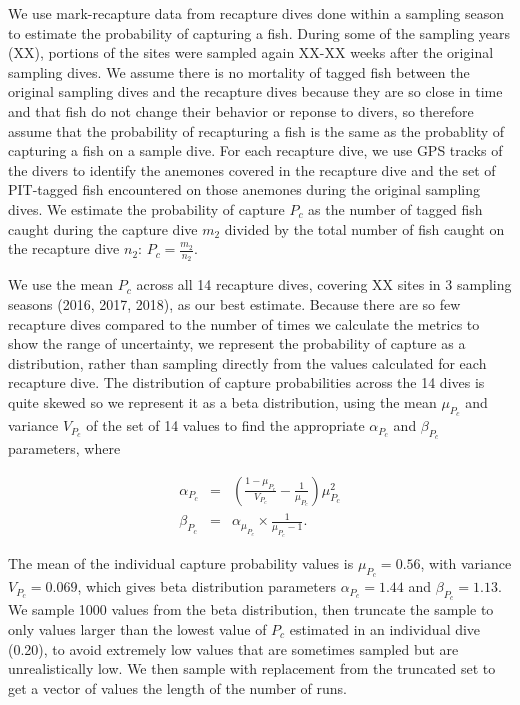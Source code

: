 \documentclass[12pt, oneside]{article}   	%
\begin{document}
We use mark-recapture data from recapture dives done within a sampling season to estimate the probability of capturing a fish. During some of the sampling years (XX), portions of the sites were sampled again XX-XX weeks after the original sampling dives. We assume there is no mortality of tagged fish between the original sampling dives and the recapture dives because they are so close in time and that fish do not change their behavior or reponse to divers, so therefore assume that the probability of recapturing a fish is the same as the probablity of capturing a fish on a sample dive. For each recapture dive, we use GPS tracks of the divers to identify the anemones covered in the recapture dive and the set of PIT-tagged fish encountered on those anemones during the original sampling dives. We estimate the probability of capture $P_c$ as the number of tagged fish caught during the capture dive $m_2$ divided by the total number of fish caught on the recapture dive $n_2$: $P_c = \frac{m_2}{n_2}$. 

We use the mean $P_c$ across all 14 recapture dives, covering XX sites in 3 sampling seasons (2016, 2017, 2018), as our best estimate. Because there are so few recapture dives compared to the number of times we calculate the metrics to show the range of uncertainty, we represent the probability of capture as a distribution, rather than sampling directly from the values calculated for each recapture dive. The distribution of capture probabilities across the 14 dives is quite skewed so we represent it as a beta distribution, using the mean $\mu_{P_c}$ and variance $V_{P_c}$ of the set of 14 values to find the appropriate $\alpha_{P_c}$ and $\beta_{P_c}$ parameters, where 

\begin{eqnarray}
\alpha_{P_c} &=& (\frac{1-\mu_{P_c}}{V_{P_c}} - \frac{1}{\mu_{P_c}}) \mu_{P_c}^2 \\
\beta_{P_c} &=& \alpha_{\mu_{P_c}} \times \frac{1}{\mu_{P_c} - 1}. \label{APP_EQN_ProbCapBetaDistParams}  %
\end{eqnarray}


The mean of the individual capture probability values is $\mu_{P_c} = 0.56$, with variance $V_{P_c} = 0.069$, which gives beta distribution parameters $\alpha_{P_c} = 1.44$ and $\beta_{P_c} = 1.13$. We sample 1000 values from the beta distribution, then truncate the sample to only values larger than the lowest value of $P_c$ estimated in an individual dive (0.20), to avoid extremely low values that are sometimes sampled but are unrealistically low. We then sample with replacement from the truncated set to get a vector of values the length of the number of runs.
\end{document}
